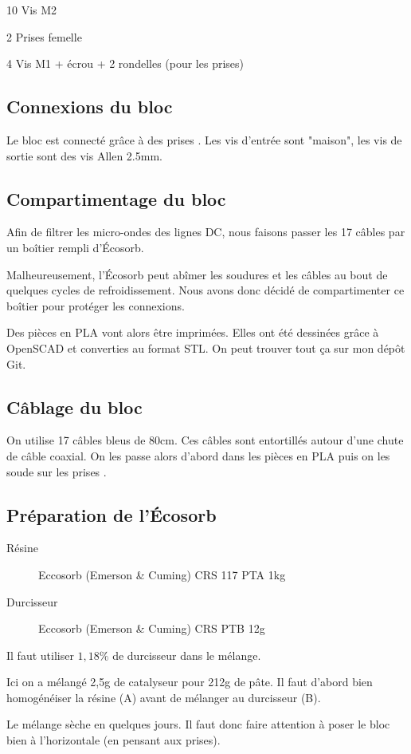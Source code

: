 

\begin{BOM}
    \item 10 \fois Vis M2
    \item 2 \fois Prises \uD femelle
    \item 4 \fois Vis M1 + écrou + 2 rondelles (pour les prises)
    \item \fois 
\end{BOM}


\subsection{Connexions du bloc}
Le bloc est connecté grâce à des prises \uD. Les vis d'entrée sont "maison", les vis de sortie sont des vis Allen 2.5mm.

\subsection{Compartimentage du bloc}
Afin de filtrer les micro-ondes des lignes DC, nous faisons passer les 17 câbles par un boîtier rempli d'Écosorb.

Malheureusement, l'Écosorb peut abîmer les soudures et les câbles au bout de quelques cycles de refroidissement. Nous avons donc décidé de compartimenter ce boîtier pour protéger les connexions.

Des pièces en PLA vont alors être imprimées. Elles ont été dessinées grâce à OpenSCAD et converties au format STL. On peut trouver tout ça sur mon dépôt Git.

\subsection{Câblage du bloc}
On utilise 17 câbles bleus de 80cm. Ces câbles sont entortillés autour d'une chute de câble coaxial. On les passe alors d'abord dans les pièces en PLA puis on les soude sur les prises \uD.

\subsection{Préparation de l'Écosorb}
\begin{description}
    \item[Résine] Eccosorb (Emerson \& Cuming) CRS 117 PTA 1kg
    \item[Durcisseur] Eccosorb (Emerson \& Cuming) CRS PTB 12g
\end{description}
Il faut utiliser $1,18\%$ de durcisseur dans le mélange.

Ici on a mélangé 2,5g de catalyseur pour 212g de pâte. Il faut d'abord bien homogénéiser la résine (A) avant de mélanger au durcisseur (B).

Le mélange sèche en quelques jours. Il faut donc faire attention à poser le bloc bien à l'horizontale (en pensant aux prises).

